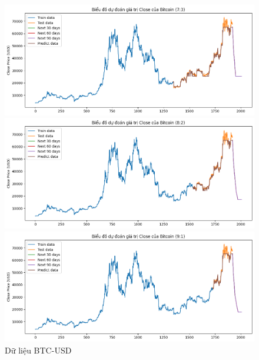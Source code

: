 \documentclass[conference]{IEEEtran}
\begin{document}
		\begin{figure}[H]
		\centering
		\begin{minipage}{0.15\textwidth}
			\centering
			\includegraphics[width=1\textwidth]{Figure/XGB_BTC_73.png}
		\end{minipage}
		\hfill
		\begin{minipage}{0.15\textwidth}
			\centering
			\includegraphics[width=1\textwidth]{Figure/XGB_BTC_82.png}
		\end{minipage}
		\hfill
		\begin{minipage}{0.15\textwidth}
			\centering
			\includegraphics[width=1\textwidth]{Figure/XGB_BTC_91.png}
		\end{minipage}
		\caption{Dữ liệu BTC-USD}
		\label{fig:1}
	\end{figure}
	
\end{document}
